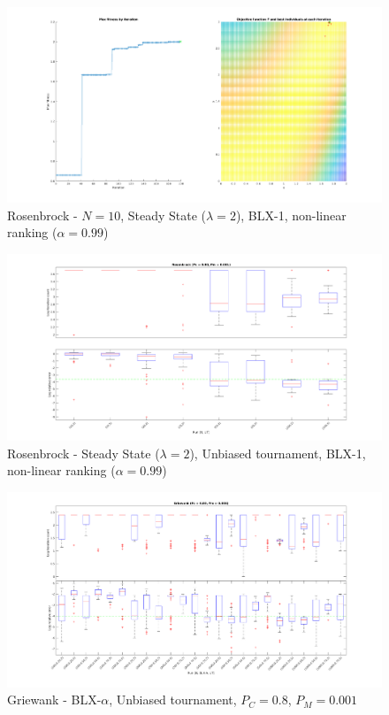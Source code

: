 \documentclass[12pt, letterpaper]{article}
\begin{document}
\begin{figure}
  \includegraphics[width=\linewidth]{img/r_ss.png}
  \centering
  \captionsetup{justification=centering}
  \caption{Rosenbrock - $N = 10$, Steady State ($\lambda = 2$), BLX-1, non-linear ranking ($\alpha = 0.99$)}
  \label{fig:r_ss}
\end{figure}

\begin{figure}
  \includegraphics[width=\linewidth]{img/r_ss_test.png}
  \centering
  \captionsetup{justification=centering}
  \caption{Rosenbrock - Steady State ($\lambda = 2$), Unbiased tournament, BLX-1, non-linear ranking ($\alpha = 0.99$)}
  \label{fig:r_ss_test}
\end{figure}

\begin{figure}
  \includegraphics[width=\linewidth]{img/g_blx_ut_08_001.png}
  \centering
  \captionsetup{justification=centering}
  \caption{Griewank - BLX-$\alpha$, Unbiased tournament, $P_C = 0.8$, $P_M = 0.001$}
  \label{fig:g_blx_ut_08_001}
\end{figure}
\end{document}
